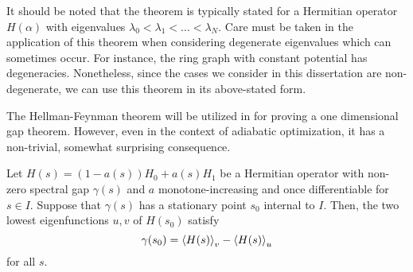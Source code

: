     It should be noted that the theorem is typically stated for a Hermitian operator $H(\alpha)$ with eigenvalues $\lambda_0 < \lambda_1 < \dots < \lambda_N$. Care must be taken in the application of this theorem when considering degenerate eigenvalues \cite{Vatsya2004,Zhang2004} which can sometimes occur. For instance, the ring graph with constant potential has degeneracies. Nonetheless, since the cases we consider in this dissertation are non-degenerate, we can use this theorem in its above-stated form.
    
    The Hellman-Feynman theorem will be utilized in  for proving a one dimensional gap theorem. However, even in the context of adiabatic optimization, it has a non-trivial, somewhat surprising consequence.
    
    \begin{thm}\label{thm:gap-conservation}
        Let $H(s) = (1-a(s))H_0 + a(s) H_1$ be a Hermitian operator with non-zero spectral gap $\gamma(s)$ and $a$ monotone-increasing and once differentiable for $s \in I$. Suppose that $\gamma(s)$ has a stationary point $s_0$ internal to $I$. Then, the two lowest eigenfunctions $u,v$ of $H(s_0)$ satisfy
        \[
            \gamma(s_0) = \left \langle H(s) \right \rangle_v - \left \langle H(s) \right \rangle_u
        \]
        for all $s$.
    \end{thm}
    
